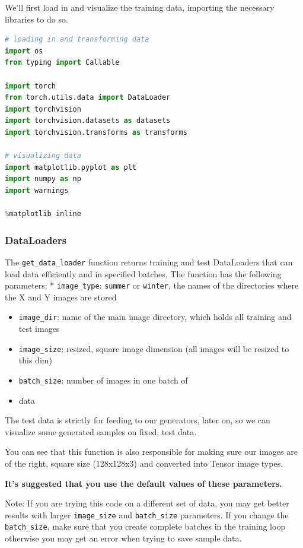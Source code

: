 We'll first load in and visualize the training data, importing the
necessary libraries to do so.

\begin{lstlisting}[language=Python]
# loading in and transforming data
import os
from typing import Callable

import torch
from torch.utils.data import DataLoader
import torchvision
import torchvision.datasets as datasets
import torchvision.transforms as transforms

# visualizing data
import matplotlib.pyplot as plt
import numpy as np
import warnings

%matplotlib inline
\end{lstlisting}

\subsubsection{DataLoaders}

The \lstinline{get_data_loader} function returns
training and test DataLoaders that can load data efficiently and in
specified batches. The function has the following parameters: 
*
\lstinline{image_type}: \lstinline{summer}
or \lstinline{winter}, the names of the directories where
the X and Y images are stored 
\begin{itemize}
    \item \lstinline{image_dir}: name of the main image directory, which holds all training and test images
    \item \lstinline{image_size}: resized, square image dimension (all images will be resized to this dim)
    \item \lstinline{batch_size}: number of images in one batch of
    \item data
\end{itemize}

The test data is strictly for feeding to our generators, later on, so we
can visualize some generated samples on fixed, test data. \newline

You can see that this function is also responsible for making sure our
images are of the right, square size (128x128x3) and converted into
Tensor image types. \newline

\textbf{It's suggested that you use the default values of these
parameters.}\newline

Note: If you are trying this code on a different set of data, you may
get better results with larger \lstinline{image_size} and
\lstinline{batch_size} parameters. If you change the
\lstinline{batch_size}, make sure that you create
complete batches in the training loop otherwise you may get an error
when trying to save sample data.

